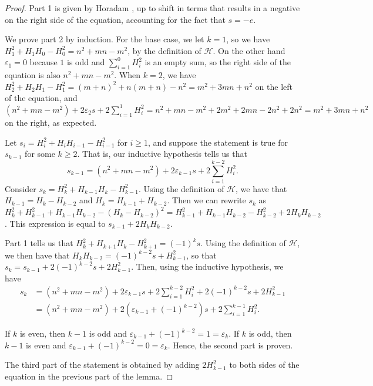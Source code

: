 \documentclass{amsart}
\newcommand{\ds}{\displaystyle}
\begin{document}
\begin{proof}
Part 1 is given by Horadam \cite{Horadam1}, up to shift in terms that results in a negative on the right side of the equation, accounting for the fact that $s = -e$.

We prove part 2 by induction. For the base case, we let $k=1$, so we have $H_1^2 + H_1H_0 - H_0^2 = n^2 + mn - m^2$, by the definition of $\mathcal H$. On the other hand $\varepsilon_1 = 0$ because $1$ is odd and $\ds \sum_{i=1}^{0} H_i^2 $ is an empty sum, so the right side of the equation is also $ n^2 + mn - m^2$. When $k=2$, we have $H_{2}^2 +H_{2}H_{1} - H_{1}^2 = (m+n)^2 + n(m+n)- n^2 = m^2 + 3mn + n^2$ on the left of the equation, and $\ds (n^2+mn -m^2) + 2\varepsilon_2 s + 2\sum_{i=1}^{1} H_i^2  = n^2 + mn -m^2 + 2m^2 + 2mn -2n^2 + 2n^2 = m^2 + 3mn + n^2$ on the right, as expected.

Let $s_i = H_{i}^2 +H_{i}H_{i-1} - H_{i-1}^2$ for $i \ge 1$, and suppose the statement is true for $s_{k-1}$ for some $k\ge 2$. That is, our inductive hypothesis tells us that $$\ds s_{k-1} = (n^2+mn -m^2) + 2\varepsilon_{k-1} s  + 2\sum_{i=1}^{k-2} H_i^2.$$ Consider $s_k = H_{k}^2 +H_{k-1}H_{k} - H_{k-1}^2$. Using the definition of $\mathcal H$, we have that $H_{k-1} = H_{k} -H_{k-2}$ and $H_{k} = H_{k-1} + {H_{k-2}}$. Then we can rewrite $s_k$ as $H_{k}^2 + H_{k-1}^2 + H_{k-1}H_{k-2} - (H_k - H_{k-2})^2 = H_{k-1}^2 + H_{k-1}H_{k-2} -H_{k-2}^2+2H_{k}H_{k-2} $. This expression is equal to $s_{k-1} + 2 H_k H_{k-2}.$

 Part 1 tells us that $H_{k}^2 +H_{k+1}H_{k} - H_{k+1}^2 = (-1)^{k}s$. Using the definition of $\mathcal H$, we then have that $H_{k}H_{k-2}  = (-1)^{k-2} s + H_{k-1}^2$, so that $s_k = s_{k-1} + 2(-1)^{k-2} s + 2H_{k-1}^2$. Then, using the inductive hypothesis, we have 
\begin{align*}
s_k &= (n^2+mn -m^2) + 2\varepsilon_{k-1} s  + 2\sum_{i=1}^{k-2} H_i^2 +2(-1)^{k-2} s + 2H_{k-1}^2\\
& =(n^2+mn -m^2) + 2(\varepsilon_{k-1}  + (-1)^{k-2})s + 2\sum_{i=1}^{k-1} H_i^2 .
\end{align*}

If $k$ is even, then $k-1$ is odd and $\varepsilon_{k-1}  + (-1)^{k-2} = 1 = \varepsilon_k$. If $k$ is odd, then $k-1$ is even and $\varepsilon_{k-1}  + (-1)^{k-2} = 0 = \varepsilon_k$. Hence, the second part is proven.

The third part of the statement is obtained by adding $2H_{k-1}^2$ to both sides of the equation in the previous part of the lemma.
\end{proof}
\end{document}
